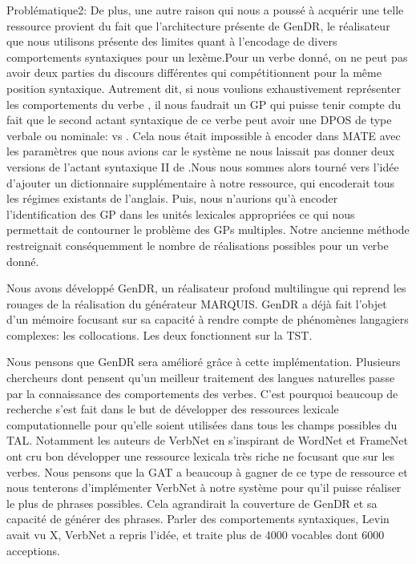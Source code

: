 Problématique2: De plus, une autre raison qui nous a poussé à acquérir une telle ressource provient du fait que l'architecture présente de GenDR, le réalisateur que nous utilisons présente des limites quant à l'encodage de divers comportements syntaxiques pour un lexème.Pour un verbe donné, on ne peut pas avoir deux parties du discours différentes qui compétitionnent pour la même position syntaxique. Autrement dit, si nous voulions exhaustivement représenter les comportements du verbe , il nous faudrait un \ac{GP} qui puisse tenir compte du fait que le second actant syntaxique de ce verbe peut avoir une \ac{DPOS} de type verbale ou nominale:  vs . Cela nous était impossible à encoder dans MATE avec les paramètres que nous avions car le système ne nous laissait pas donner deux versions de l'actant syntaxique II de .Nous nous sommes alors tourné vers l'idée d'ajouter un dictionnaire supplémentaire à notre ressource, qui encoderait tous les régimes existants de l'anglais. Puis, nous n'aurions qu'à encoder l'identification des \ac{GP} dans les unités lexicales appropriées ce qui nous permettait de contourner le problème des \acp{GP} multiples. Notre ancienne méthode restreignait conséquemment le nombre de réalisations possibles pour un verbe donné.

Nous avons développé GenDR, un réalisateur profond multilingue qui reprend les rouages de la réalisation du générateur MARQUIS. GenDR a déjà fait l'objet d'un mémoire focusant sur sa capacité à rendre compte de phénomènes langagiers complexes: les collocations. Les deux fonctionnent sur la TST.

 Nous pensons que GenDR sera amélioré grâce à cette implémentation. Plusieurs chercheurs dont \cite{SchulerVerbnetBroadcoverageComprehensive2005,Korhonenlargesubcategorizationlexicon2006} pensent qu'un meilleur traitement des langues naturelles passe par la connaissance des comportements des verbes. C'est pourquoi beaucoup de recherche s'est fait dans le but de développer des ressources lexicale computationnelle pour qu'elle soient utilisées dans tous les champs possibles du \ac{TAL}. Notamment les auteurs de VerbNet en s'inspirant de WordNet et FrameNet ont cru bon développer une ressource lexicala très riche ne focusant que sur les verbes. Nous pensons que la \ac{GAT} a beaucoup à gagner de ce type de ressource et nous tenterons d'implémenter VerbNet à notre système pour qu'il puisse réaliser le plus de phrases possibles. Cela agrandirait la couverture de GenDR et sa capacité de générer des phrases. Parler des comportements syntaxiques, Levin avait vu X, VerbNet a repris l'idée, et traite plus de 4000 vocables dont 6000 acceptions.

